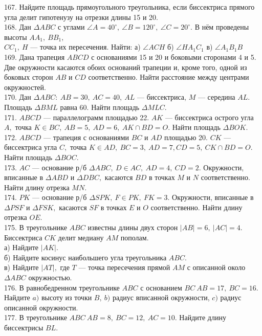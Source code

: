 167. Найдите площадь прямоугольного треугольника, если биссектриса прямого угла делит гипотенузу на отрезки длины 15 и 20.\\
168. Дан $\Delta ABC$ с углами $\angle A=40^\circ,\ \angle B=120^\circ,\ \angle C=20^\circ.$ В нём проведены высоты $AA_1,\ BB_1,$\\$ CC_1,\ H$ --- точка их пересечения. Найти: а) $\angle ACH$ б) $\angle HA_1C_1$ в) $\angle A_1B_1B$\\
169. Дана трапеция $ABCD$ с основаниями 15 и 20 и боковыми сторонами 4 и 5. Две окружности касаются обоих оснований трапеции и, кроме того, одной из боковых сторон $AB$ и $CD$ соответственно. Найти расстояние между центрами окружностей.\\
170. Дан $\Delta ABC:\ AB=30,\ AC=40,\ AL$ --- биссектриса, $M$ --- середина $AL.$ Площадь $\Delta BML$ равна 60. Найти площадь $\Delta MLC.$\\
171. $ABCD$ --- параллелограмм площадью 22. $AK$ --- биссектриса острого угла $A,$ точка $K\in BC,\ AB=5,\ AD=6,\ AK\cap BD=O.$ Найти площадь $\Delta BOK.$\\
172. $ABCD$ --- трапеция с основаниями $BC$ и $AD$ площадью 20. $CK$ --- биссектриса угла $C,$ точка $K\in AD,\ BC=3,\ AD=7, CD=5,\ CK\cap BD=O.$ Найти площадь $\Delta BOC.$\\
173. $AC$ --- основание р/б $\Delta ABC,\ D\in AC,\ AD=4,\ CD=2.$ Окружности, вписанные в $\Delta ABD$ и $\Delta DBC,$ касаются $BD$ в точках $M$ и $N$ соответственно. Найти длину отрезка $MN.$\\
174. $PK$ --- основание р/б $\Delta SPK,\ F\in PK,\ FK=3.$ Окружности, вписанные в $\Delta PSF$ и $\Delta FSK,$ касаются $SF$ в точках $E$ и $O$ соответственно. Найти длину отрезка $OE.$\\
175. В треугольнике $ABC$ известны длины двух сторон $|AB|=6,\ |AC|=4.$ Биссектриса $CK$ делит медиану $AM$ пополам.\\
а) Найдите $|AK|.$\\
б) Найдите косинус наибольшего угла треугольника $ABC.$\\
в) Найдите $|AT|,$ где $T$ --- точка пересечения прямой $AM$ с описанной около $\Delta ABC$ окружностью.\\
176. В равнобедренном треугольнике $ABC$ с основанием $BC\ AB=17,\ BC=16.$ Найдите $a)$ высоту из точки $B,\ b)$ радиус вписанной окружности, $c)$ радиус описанной окружности.\\
177. В треугольнике $ABC\ AB=8,\ BC=12,\ AC=10.$ Найдите длину биссектрисы $BL.$\\
